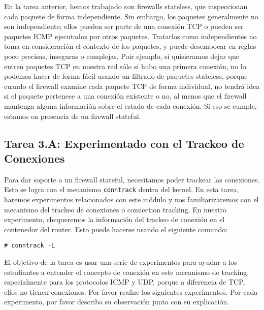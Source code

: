 En la tarea anterior, hemos trabajado con firewalls stateless, que inspeccionan cada paquete de forma independiente. Sin embargo, los paquetes generalmente no son independiente; ellos pueden ser parte de una conexión TCP o pueden ser paquetes ICMP ejecutados por otros paquetes. Tratarlos como independientes no toma en consideración el contexto de los paquetes, y puede desembocar en reglas poco precisas, inseguras o complejas.
Poir ejemplo, si quisieramos dejar que entren paquetes TCP en nuestra red sólo si hubo una primera conexión, no lo podemos hacer de forma fácil usando un filtrado de paquetes stateless, porque cuando el firewall examine cada paquete TCP de forma individual, no tendrá idea si el paquete pertenece a una conexión existente o no, al menos que el firewall mantenga alguna información sobre el estado de cada conexión.
Si eso se cumple, estamos en presencia de un firewall stateful.

\subsection{Tarea 3.A: Experimentado con el Trackeo de Conexiones} 

Para dar soporte a un firewall stateful, necesitamos poder trackear las conexiones.
Esto se logra con el mecanismo \texttt{conntrack} dentro del kernel.
En esta tarea, haremos experimentos relacionados con este módulo y nos familiarizaremos con el mecanismo del trackeo de conexiones o connection tracking.
En nuestro experimento, chequeremos la información del trackeo de conexión en el contenedor del router. Esto puede hacerse usando el siguiente comando:

\begin{lstlisting}
# conntrack -L
\end{lstlisting}

El objetivo de la tarea es usar una serie de experimentos para ayudar a los estudiantes a entender el concepto de conexión en este mecanismo de tracking, especialmente para los protocolos ICMP y UDP, porque a diferencia de TCP, ellos no tienen conexiones.
Por favor realize los siguientes experimentos. Por cada experimento, por favor describa su observación junto con su explicación.

